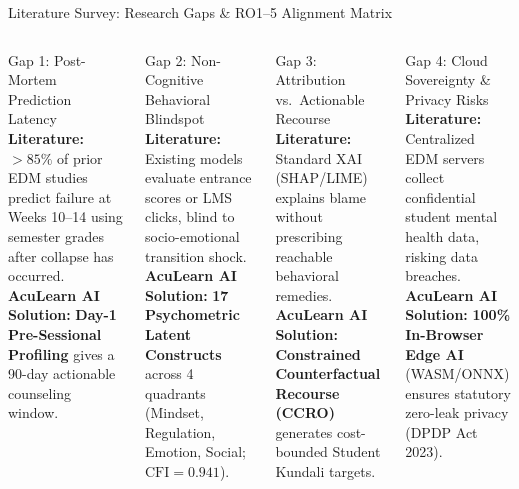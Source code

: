 \documentclass{beamer}
\begin{document}
\begin{frame}[t]{Literature Survey: Research Gaps \& RO1--5 Alignment Matrix}
  \begin{columns}[T]
    \begin{block}{\scriptsize Gap 1: Post-Mortem Prediction Latency}
      \fontsize{5.6pt}{7.0pt}\selectfont
      \textbf{Literature:} $>85\%$ of prior EDM studies predict failure at Weeks 10--14 using semester grades after collapse has occurred.\\[2pt]
      \textbf{AcuLearn AI Solution:} \textbf{Day-1 Pre-Sessional Profiling} gives a 90-day actionable counseling window.
    \end{block}
    \vspace{4pt}
    \begin{block}{\scriptsize Gap 2: Non-Cognitive Behavioral Blindspot}
      \fontsize{5.6pt}{7.0pt}\selectfont
      \textbf{Literature:} Existing models evaluate entrance scores or LMS clicks, blind to socio-emotional transition shock.\\[2pt]
      \textbf{AcuLearn AI Solution:} \textbf{17 Psychometric Latent Constructs} across 4 quadrants (Mindset, Regulation, Emotion, Social; $\text{CFI}=0.941$).
    \end{block}

    \begin{block}{\scriptsize Gap 3: Attribution vs.\ Actionable Recourse}
      \fontsize{5.6pt}{7.0pt}\selectfont
      \textbf{Literature:} Standard XAI (SHAP/LIME) explains blame without prescribing reachable behavioral remedies.\\[2pt]
      \textbf{AcuLearn AI Solution:} \textbf{Constrained Counterfactual Recourse (CCRO)} generates cost-bounded Student Kundali targets.
    \end{block}
    \vspace{4pt}
    \begin{block}{\scriptsize Gap 4: Cloud Sovereignty \& Privacy Risks}
      \fontsize{5.6pt}{7.0pt}\selectfont
      \textbf{Literature:} Centralized EDM servers collect confidential student mental health data, risking data breaches.\\[2pt]
      \textbf{AcuLearn AI Solution:} \textbf{100\% In-Browser Edge AI} (WASM/ONNX) ensures statutory zero-leak privacy (DPDP Act 2023).
    \end{block}
  \end{columns}
\end{frame}
\end{document}

